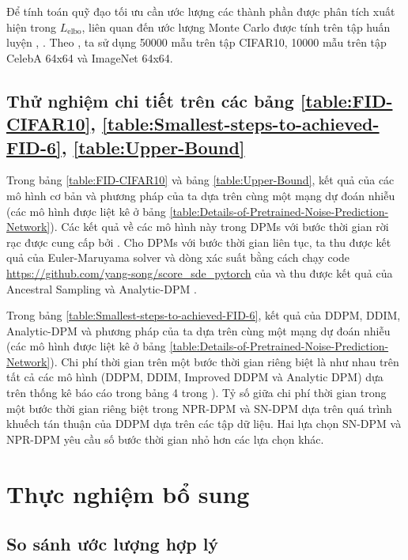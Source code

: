 \documentclass[14pt, a4paper]{article}
\numberwithin{equation}{section}
\numberwithin{figure}{section}
\numberwithin{dl}{section}
\numberwithin{md}{section}
\numberwithin{bd}{section}
\numberwithin{dn}{section}
\numberwithin{hq}{section}
\begin{document}
    Để tính toán quỹ đạo tối ưu cần ước lượng các thành phần được phân tích xuất hiện trong $L_{\mathrm{elbo}}$, liên quan đến ước lượng Monte Carlo được tính trên tập huấn luyện \cite{watson2021learning}, \cite{bao2021analytic}.
    Theo \cite{bao2021analytic}, ta sử dụng 50000 mẫu trên tập CIFAR10, 10000 mẫu trên tập CelebA 64x64 và ImageNet 64x64.

    \subsection{Thử nghiệm chi tiết trên các bảng \ref{table:FID-CIFAR10}, \ref{table:Smallest-steps-to-achieved-FID-6}, \ref{table:Upper-Bound}}

    Trong bảng \ref{table:FID-CIFAR10} và bảng \ref{table:Upper-Bound}, kết quả của các mô hình cơ bản và phương pháp của ta dựa trên cùng một mạng dự đoán nhiễu (các mô hình được liệt kê ở bảng \ref{table:Details-of-Pretrained-Noise-Prediction-Network}).
    Các kết quả về các mô hình này trong DPMs với bước thời gian rời rạc được cung cấp bởi \cite{bao2021analytic}.
    Cho DPMs với bước thời gian liên tục, ta thu được kết quả của Euler-Maruyama solver và dòng xác suất bằng cách chạy code \url{https://github.com/yang-song/score_sde_pytorch} của \cite{song2020score} và thu được kết quả của Ancestral Sampling và Analytic-DPM \cite{bao2021analytic}.

    Trong bảng \ref{table:Smallest-steps-to-achieved-FID-6}, kết quả của DDPM, DDIM, Analytic-DPM và phương pháp của ta dựa trên cùng một mạng dự đoán nhiễu (các mô hình được liệt kê ở bảng \ref{table:Details-of-Pretrained-Noise-Prediction-Network}).
    Chi phí thời gian trên một bước thời gian riêng biệt là như nhau trên tất cả các mô hình (DDPM, DDIM, Improved DDPM và Analytic DPM) dựa trên thống kê báo cáo trong bảng 4 trong \cite{bao2021analytic}).
    Tỷ số giữa chi phí thời gian trong một bước thời gian riêng biệt trong NPR-DPM và SN-DPM dựa trên quá trình khuếch tán thuận của DDPM dựa trên các tập dữ liệu.
    Hai lựa chọn SN-DPM và NPR-DPM yêu cầu số bước thời gian nhỏ hơn các lựa chọn khác.

    \section{Thực nghiệm bổ sung}

    \subsection{So sánh ước lượng hợp lý}
\end{document}
